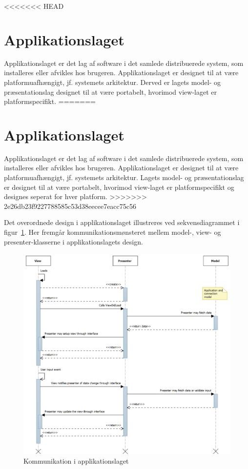 <<<<<<< HEAD
\section{Applikationslaget}
Applikationslaget er det lag af software i det samlede distribuerede system, som installeres eller afvikles hos brugeren. Applikationslaget er designet til at være platformuafhængigt, jf. systemets arkitektur. Derved er lagets model- og præsentationslag designet til at være portabelt, hvorimod view-laget er platformspecifikt. 
=======
\section{Applikationslaget}
Applikationslaget er det lag af software i det samlede distribuerede system, som installeres eller afvikles hos brugeren. Applikationslaget er designet til at være platformuafhængigt, jf. systemets arkitektur. Lagets model- og præsentationslag er designet til at være portabelt, hvorimod view-laget er platformspecifikt og designes seperat for hver platform. 
>>>>>>> 2e26db23f9227788585c53d38eecee7eacc75c56

Det overordnede design i applikationslaget illustreres ved sekvensdiagrammet i figur~\ref{fig:application_sd}. Her fremgår kommunikationsmønsteret mellem model-, view- og presenter-klasserne i applikationslagets design.

\begin{figure}
	\centering
	\includegraphics[width=1.0\linewidth]{figs/design/application_sd}
	\caption{Kommunikation i applikationslaget}
	\label{fig:application_sd}
\end{figure}

